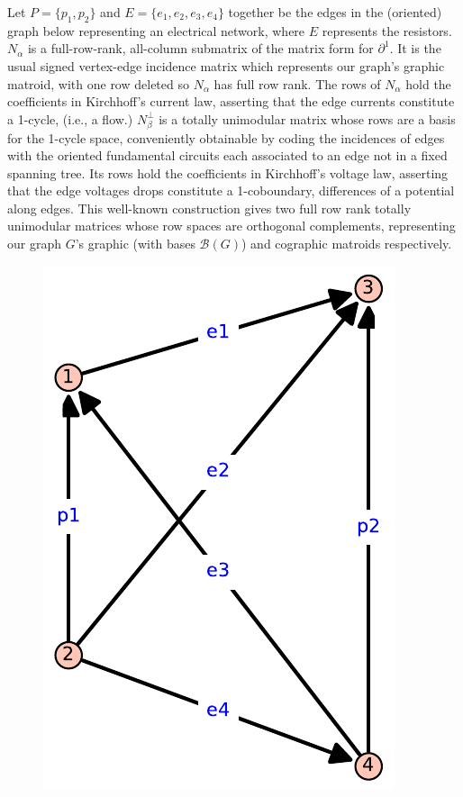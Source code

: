 Let $P=\{p_1, p_2\}$ and $E=\{e_1, e_2, e_3, e_4\}$ together be the edges in the (oriented) graph
below representing an electrical network, where $E$ represents the resistors.   $N_\alpha$ is
a full-row-rank, all-column submatrix of the matrix form for $\partial^1$.  It is the
usual signed vertex-edge incidence matrix which represents our graph's graphic matroid, with one
row deleted so $N_\alpha$ has full row rank.  The rows of $N_\alpha$ hold the coefficients in
Kirchhoff's current law, asserting that the edge currents constitute a 1-cycle, (i.e., a flow.)
$N_\beta^\perp$ is a totally unimodular matrix whose
rows are a basis for the 1-cycle space, conveniently
obtainable by coding the incidences of edges with the oriented fundamental
circuits each associated to an edge not in a fixed spanning tree.
Its rows hold the coefficients in
Kirchhoff's voltage law, asserting that the edge
voltages drops constitute a 1-coboundary, differences
of a potential along edges.
This well-known construction gives
two full row rank totally unimodular matrices whose row spaces are orthogonal complements,
representing our graph $G$'s
graphic (with bases $\mathcal{B}(G)$) and cographic matroids respectively.

\begin{figure}
  \includegraphics[scale=0.5]{K4.pdf}
\end{figure}

